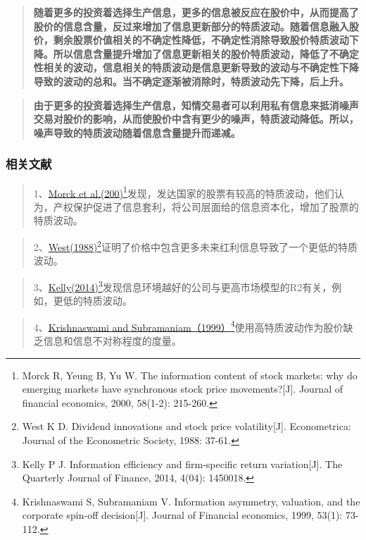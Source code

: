\documentclass[
]{article}
\begin{document}
\begin{quote}
{\textbf{随着更多的投资着选择生产信息，更多的信息被反应在股价中，从而提高了股价的信息含量，反过来增加了信息更新部分的特质波动。随着信息融入股价，剩余股票价值相关的不确定性降低，不确定性消除导致股价特质波动下降。所以信息含量提升增加了信息更新相关的股价特质波动，降低了不确定性相关的波动，信息相关的特质波动是信息更新导致的波动与不确定性下降导致的波动的总和。当不确定逐渐被消除时，特质波动先下降，后上升。}}
\end{quote}

\begin{quote}
\textbf{由于更多的投资着选择生产信息，知情交易者可以利用私有信息来抵消噪声交易对股价的影响，从而使股价中含有更少的噪声，特质波动降低。所以，噪声导致的特质波动随着信息含量提升而递减。}
\end{quote}

\hypertarget{ux76f8ux5173ux6587ux732e}{%
\subsubsection{相关文献}\label{ux76f8ux5173ux6587ux732e}}

\begin{quote}
1、\href{https://doi.org/10.1016/S0304-405X(00)00071-4}{Morck et
al.(200)}\footnote{Morck R, Yeung B, Yu W. The information content of
  stock markets: why do emerging markets have synchronous stock price
  movements?{[}J{]}. Journal of financial economics, 2000, 58(1-2):
  215-260.}发现，发达国家的股票有较高的特质波动，他们认为，产权保护促进了信息套利，将公司层面给的信息资本化，增加了股票的特质波动。
\end{quote}

\begin{quote}
2、\href{https://doi.org/10.2307/1911841}{West(1988)}\footnote{West K D.
  Dividend innovations and stock price volatility{[}J{]}. Econometrica:
  Journal of the Econometric Society, 1988: 37-61.}证明了价格中包含更多未来红利信息导致了一个更低的特质波动。
\end{quote}

\begin{quote}
3、\href{https://doi.org/10.1142/S2010139214500189}{Kelly(2014)}\footnote{Kelly
  P J. Information efficiency and firm-specific return variation{[}J{]}.
  The Quarterly Journal of Finance, 2014, 4(04): 1450018.}发现信息环境越好的公司与更高市场模型的R2有关，例如，更低的特质波动。
\end{quote}

\begin{quote}
4、\href{https://doi.org/10.1016/S0304-405X(99)00017-3}{Krishnaswami and
Subramaniam（1999）}\footnote{Krishnaswami S, Subramaniam V. Information
  asymmetry, valuation, and the corporate spin-off decision{[}J{]}.
  Journal of Financial economics, 1999, 53(1): 73-112.}使用高特质波动作为股价缺乏信息和信息不对称程度的度量。
\end{quote}
\end{document}
